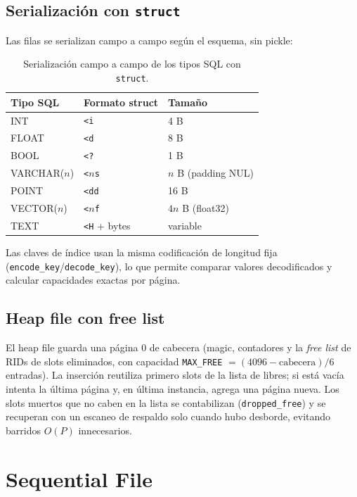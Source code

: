 \documentclass[11pt]{article}
\begin{document}
\subsection{Serialización con \texttt{struct}}

Las filas se serializan campo a campo según el esquema, sin pickle:

\begin{table}[!htb]
\centering
\caption{Serialización campo a campo de los tipos SQL con \texttt{struct}.}
\label{tab:struct}
\begin{tabular}{@{}lll@{}}
\toprule
\rowcolor{utecblue!10}\textbf{Tipo SQL} & \textbf{Formato struct} & \textbf{Tamaño} \\
\midrule
INT & \texttt{<i} & 4 B \\
FLOAT & \texttt{<d} & 8 B \\
BOOL & \texttt{<?} & 1 B \\
VARCHAR($n$) & \texttt{<$n$s} & $n$ B (padding NUL) \\
POINT & \texttt{<dd} & 16 B \\
VECTOR($n$) & \texttt{<$n$f} & $4n$ B (float32) \\
TEXT & \texttt{<H} + bytes & variable \\
\bottomrule
\end{tabular}
\end{table}

Las claves de índice usan la misma codificación de longitud fija
(\texttt{encode\_key}/\texttt{decode\_key}), lo que permite comparar
valores decodificados y calcular capacidades exactas por página.

\subsection{Heap file con free list}

El heap file guarda una página 0 de cabecera (magic, contadores y la
\emph{free list} de RIDs de slots eliminados, con capacidad
\texttt{MAX\_FREE} $= (4096 - \text{cabecera}) / 6$ entradas). La inserción
reutiliza primero slots de la lista de libres; si está vacía intenta la
última página y, en última instancia, agrega una página nueva. Los slots
muertos que no caben en la lista se contabilizan (\texttt{dropped\_free})
y se recuperan con un escaneo de respaldo solo cuando hubo desborde, evitando
barridos $O(P)$ innecesarios.

\section{Sequential File}
\end{document}
